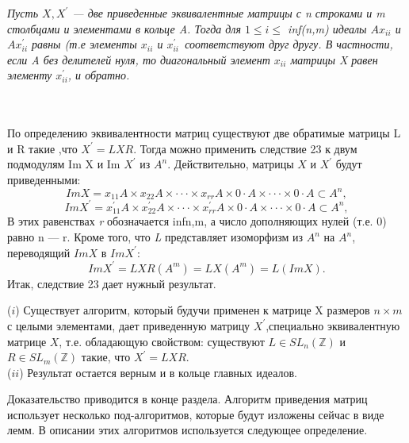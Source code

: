 \begin{sled}
\hspace*{0.5cm}
\textit{Пусть $X, X^{'}$ — две приведенные эквивалентные матрицы с n строками и m столбцами и элементами в кольце A. Тогда для $ 1 \leqslant i \leqslant $ inf(\textit{n,m}) идеалы $Ax_{ii}$ и $Ax^{'}_{ii}$ равны (т.е элементы $x_{ii}$ и $x^{'}_{ii} $~соответствуют друг другу. В частности, если A без делителей нуля, то диагональный элемент $x_{ii}$ матрицы X равен элементу $x^{'}_{ii}$, и обратно.}\\\\\\
\end{sled}

\begin{myproof}
По определению эквивалентности матриц существуют две обратимые матрицы L и R такие ,что $X^{'} = L X R$. Тогда можно применить следствие 23 к двум подмодулям Im X и Im $X^{'}$ из $A^{n}$. Действительно, матрицы $X$ и $X^{'}$ будут приведенными:
$$ Im X = x_{11} A \times x_{22} A \times \cdot \cdot \cdot \times x_{rr} A \times 0 \cdot A \times \cdot \cdot \cdot \times 0 \cdot A \subset A^{n}, $$
$$ Im X^{'} = x_{11}^{'} A \times x_{22}^{'} A \times \cdot \cdot \cdot \times x_{rr}^{'} A \times 0 \cdot A \times \cdot \cdot \cdot \times 0 \cdot A \subset A^{n}, $$
В этих равенствах \textit{r} обозначается inf{n,m}, а число дополняющих нулей (т.е. 0) равно n — r. Кроме того, что \textit{L} представляет изоморфизм из $A^{n}$ на $A^{n}$, переводящий $Im X$ в $Im X^{'}$:
$$ Im X^{'} = L X R(A^{m}) = L X (A^{m}) = L(Im X). $$
Итак, следствие 23 дает нужный результат.\\
\end{myproof}
\begin{thm}
\hspace*{0.5cm}
($i$) Существует алгоритм, который будучи применен к матрице X размеров $n \times m $ с целыми элементами, дает приведенную матрицу $X^{'}$,специально эквивалентную матрице $X$, т.е. обладающую свойством: существуют $ L \in S L_{n}(\mathbb{Z})$ и $R \in S L_{m}(\mathbb{Z})$ такие, что $X^{'} = L X R$.\\

($ii$) Результат остается верным и в кольце главных идеалов.
\end{thm}
Доказательство приводится в конце раздела. Алгоритм приведения матриц использует несколько под-алгоритмов, которые будут изложены сейчас в виде лемм. В описании этих алгоритмов используется следующее определение.

